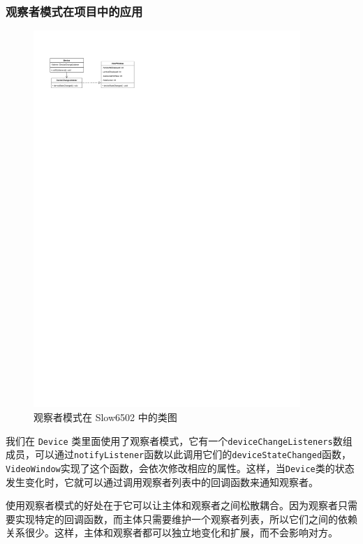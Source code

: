 \subsubsection{观察者模式在项目中的应用}

\begin{figure}[H]
  \centering
  \includegraphics[width=0.9\textwidth]{figures/Observer.pdf}
  \caption{观察者模式在 Slow6502 中的类图}
\end{figure}


我们在 \lstinline{Device} 类里面使用了观察者模式，它有一个\lstinline{deviceChangeListeners}数组成员，可以通过\lstinline{notifyListener}函数以此调用它们的\lstinline{deviceStateChanged}函数，\lstinline{VideoWindow}实现了这个函数，会依次修改相应的属性。这样，当\lstinline{Device}类的状态发生变化时，它就可以通过调用观察者列表中的回调函数来通知观察者。

使用观察者模式的好处在于它可以让主体和观察者之间松散耦合。因为观察者只需要实现特定的回调函数，而主体只需要维护一个观察者列表，所以它们之间的依赖关系很少。这样，主体和观察者都可以独立地变化和扩展，而不会影响对方。